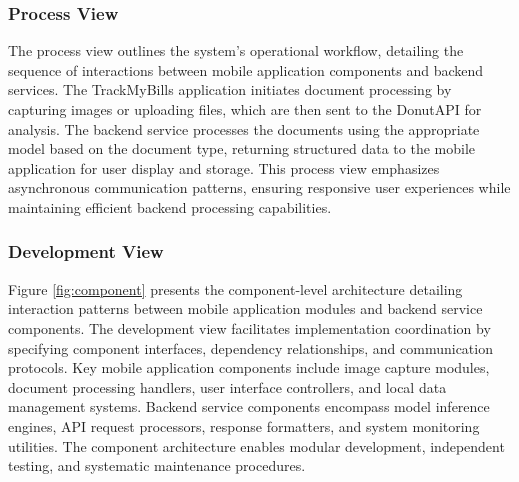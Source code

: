 \subsubsection{Process View}

The process view outlines the system's operational workflow, detailing the sequence of interactions between mobile application components and backend services. The TrackMyBills application initiates document processing by capturing images or uploading files, which are then sent to the DonutAPI for analysis. The backend service processes the documents using the appropriate model based on the document type, returning structured data to the mobile application for user display and storage. This process view emphasizes asynchronous communication patterns, ensuring responsive user experiences while maintaining efficient backend processing capabilities.


\subsubsection{Development View}

Figure \ref{fig:component} presents the component-level architecture detailing interaction patterns between mobile application modules and backend service components. The development view facilitates implementation coordination by specifying component interfaces, dependency relationships, and communication protocols. Key mobile application components include image capture modules, document processing handlers, user interface controllers, and local data management systems. Backend service components encompass model inference engines, API request processors, response formatters, and system monitoring utilities. The component architecture enables modular development, independent testing, and systematic maintenance procedures.

